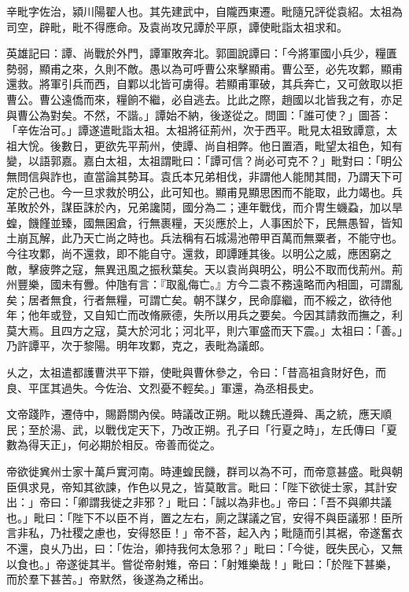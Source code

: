 
\begin{pinyinscope}
辛毗字佐治，潁川陽翟人也。其先建武中，自隴西東遷。毗隨兄評從袁紹。太祖為司空，辟毗，毗不得應命。及袁尚攻兄譚於平原，譚使毗詣太祖求和。

英雄記曰：譚、尚戰於外門，譚軍敗奔北。郭圖說譚曰：「今將軍國小兵少，糧匱勢弱，顯甫之來，久則不敵。愚以為可呼曹公來擊顯甫。曹公至，必先攻鄴，顯甫還救。將軍引兵而西，自鄴以北皆可虜得。若顯甫軍破，其兵奔亡，又可斂取以拒曹公。曹公遠僑而來，糧餉不繼，必自逃去。比此之際，趙國以北皆我之有，亦足與曹公為對矣。不然，不諧。」譚始不納，後遂從之。問圖：「誰可使？」圖荅：「辛佐治可。」譚遂遣毗詣太祖。太祖將征荊州，次于西平。毗見太祖致譚意，太祖大恱。後數日，更欲先平荊州，使譚、尚自相弊。他日置酒，毗望太祖色，知有變，以語郭嘉。嘉白太祖，太祖謂毗曰：「譚可信？尚必可克不？」毗對曰：「明公無問信與詐也，直當論其勢耳。袁氏本兄弟相伐，非謂他人能閒其間，乃謂天下可定於己也。今一旦求救於明公，此可知也。顯甫見顯思困而不能取，此力竭也。兵革敗於外，謀臣誅於內，兄弟讒鬩，國分為二；連年戰伐，而介冑生蟣蝨，加以旱蝗，饑饉並臻，國無囷倉，行無裹糧，天災應於上，人事困於下，民無愚智，皆知土崩瓦解，此乃天亡尚之時也。兵法稱有石城湯池帶甲百萬而無粟者，不能守也。今往攻鄴，尚不還救，即不能自守。還救，即譚踵其後。以明公之威，應困窮之敵，擊疲弊之寇，無異迅風之振秋葉矣。天以袁尚與明公，明公不取而伐荊州。荊州豐樂，國未有釁。仲虺有言：『取亂侮亡。』方今二袁不務遠略而內相圖，可謂亂矣；居者無食，行者無糧，可謂亡矣。朝不謀夕，民命靡繼，而不綏之，欲待他年；他年或登，又自知亡而改脩厥德，失所以用兵之要矣。今因其請救而撫之，利莫大焉。且四方之寇，莫大於河北；河北平，則六軍盛而天下震。」太祖曰：「善。」乃許譚平，次于黎陽。明年攻鄴，克之，表毗為議郎。

乆之，太祖遣都護曹洪平下辯，使毗與曹休參之，令曰：「昔高祖貪財好色，而良、平匡其過失。今佐治、文烈憂不輕矣。」軍還，為丞相長史。

文帝踐阼，遷侍中，賜爵關內侯。時議改正朔。毗以魏氏遵舜、禹之統，應天順民；至於湯、武，以戰伐定天下，乃改正朔。孔子曰「行夏之時」，左氏傳曰「夏數為得天正」，何必期於相反。帝善而從之。

帝欲徙兾州士家十萬戶實河南。時連蝗民饑，群司以為不可，而帝意甚盛。毗與朝臣俱求見，帝知其欲諫，作色以見之，皆莫敢言。毗曰：「陛下欲徙士家，其計安出：」帝曰：「卿謂我徙之非邪？」毗曰：「誠以為非也。」帝曰：「吾不與卿共議也。」毗曰：「陛下不以臣不肖，置之左右，廁之謀議之官，安得不與臣議邪！臣所言非私，乃社稷之慮也，安得怒臣！」帝不荅，起入內；毗隨而引其裾，帝遂奮衣不還，良乆乃出，曰：「佐治，卿持我何太急邪？」毗曰：「今徙，旣失民心，又無以食也。」帝遂徙其半。嘗從帝射雉，帝曰：「射雉樂哉！」毗曰：「於陛下甚樂，而於羣下甚苦。」帝默然，後遂為之稀出。


\end{pinyinscope}
